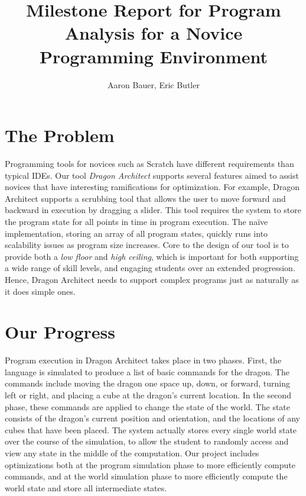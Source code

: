 \documentclass{sig-alternate}
\begin{document}
\title{Milestone Report for Program Analysis for a Novice Programming Environment}
\author{Aaron Bauer, Eric Butler}
\maketitle{}

\section*{The Problem}
Programming tools for novices such as Scratch have different requirements than typical IDEs. Our tool \emph{Dragon Architect} supports several features aimed to assist novices that have interesting ramifications for optimization. For example, Dragon Architect supports a scrubbing tool that allows the user to move forward and backward in execution by dragging a slider. This tool requires the system to store the program state for all points in time in program execution. The na\"{i}ve implementation, storing an array of all program states, quickly runs into scalability issues as program size increases. Core to the design of our tool is to provide both a \emph{low floor} and \emph{high ceiling}, which is important for both supporting a wide range of skill levels, and engaging students over an extended progression. Hence, Dragon Architect needs to support complex programs just as naturally as it does simple ones. 

\section*{Our Progress}

Program execution in Dragon Architect takes place in two phases. First, the language is simulated to produce a list of basic commands for the dragon. The commands include moving the dragon one space up, down, or forward, turning left or right, and placing a cube at the dragon's current location. In the second phase, these commands are applied to change the state of the world. The state consists of the dragon's current position and orientation, and the locations of any cubes that have been placed. The system actually stores every single world state over the course of the simulation, to allow the student to randomly access and view any state in the middle of the computation. Our project includes optimizations both at the program simulation phase to more efficiently compute commands, and at the world simulation phase to more efficiently compute the world state and store all intermediate states.
\end{document}
